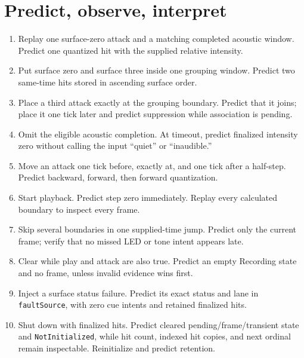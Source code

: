 \documentclass[11pt]{article}
\begin{document}
\section{Predict, observe, interpret}
\begin{enumerate}
 \item Replay one surface-zero attack and a matching completed acoustic
       window. Predict one quantized hit with the supplied relative intensity.
 \item Put surface zero and surface three inside one grouping window. Predict
       two same-time hits stored in ascending surface order.
 \item Place a third attack exactly at the grouping boundary. Predict that it
       joins; place it one tick later and predict suppression while association
       is pending.
 \item Omit the eligible acoustic completion. At timeout, predict finalized
       intensity zero without calling the input ``quiet'' or ``inaudible.''
 \item Move an attack one tick before, exactly at, and one tick after a
       half-step. Predict backward, forward, then forward quantization.
 \item Start playback. Predict step zero immediately. Replay every calculated
       boundary to inspect every frame.
 \item Skip several boundaries in one supplied-time jump. Predict only the
       current frame; verify that no missed LED or tone intent appears late.
 \item Clear while play and attack are also true. Predict an empty Recording
       state and no frame, unless invalid evidence wins first.
 \item Inject a surface status failure. Predict its exact status and lane in
       \texttt{faultSource}, with zero cue intents and retained finalized hits.
 \item Shut down with finalized hits. Predict cleared pending/frame/transient
       state and \texttt{NotInitialized}, while hit count, indexed hit copies,
       and next ordinal remain inspectable. Reinitialize and predict retention.
\end{enumerate}
\end{document}
